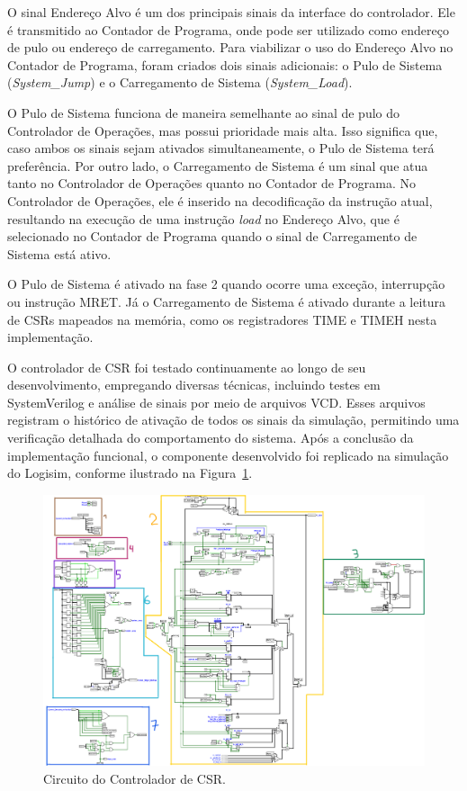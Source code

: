 \documentclass[
	12pt,				%
	openright,			%
	oneside,			%
	a4paper,			%
	english,			%
	french,				%
	spanish,			%
	brazil,				%
	]{abntex2}
\begin{document}
O sinal Endereço Alvo é um dos principais sinais da interface do controlador. Ele é transmitido ao Contador de Programa, onde pode ser utilizado como endereço de pulo ou endereço de carregamento. Para viabilizar o uso do Endereço Alvo no Contador de Programa, foram criados dois sinais adicionais: o Pulo de Sistema (\textit{System\_Jump}) e o Carregamento de Sistema (\textit{System\_Load}).

O Pulo de Sistema funciona de maneira semelhante ao sinal de pulo do Controlador de Operações, mas possui prioridade mais alta. Isso significa que, caso ambos os sinais sejam ativados simultaneamente, o Pulo de Sistema terá preferência. Por outro lado, o Carregamento de Sistema é um sinal que atua tanto no Controlador de Operações quanto no Contador de Programa. No Controlador de Operações, ele é inserido na decodificação da instrução atual, resultando na execução de uma instrução \textit{load} no Endereço Alvo, que é selecionado no Contador de Programa quando o sinal de Carregamento de Sistema está ativo.

O Pulo de Sistema é ativado na fase 2 quando ocorre uma exceção, interrupção ou instrução MRET. Já o Carregamento de Sistema é ativado durante a leitura de CSRs mapeados na memória, como os registradores TIME e TIMEH nesta implementação.

O controlador de CSR foi testado continuamente ao longo de seu desenvolvimento, empregando diversas técnicas, incluindo testes em SystemVerilog e análise de sinais por meio de arquivos VCD. Esses arquivos registram o histórico de ativação de todos os sinais da simulação, permitindo uma verificação detalhada do comportamento do sistema. Após a conclusão da implementação funcional, o componente desenvolvido foi replicado na simulação do Logisim, conforme ilustrado na Figura~\ref{fig:Controlador_CSR}.

\begin{figure}[h]
    \centering
    \includegraphics[width=1\linewidth]{ProcessoDesenvolvimento/Arquitetura/CSR_Controller.png}
    \caption{Circuito do Controlador de CSR.}
    \label{fig:Controlador_CSR}
\end{figure}
\end{document}
